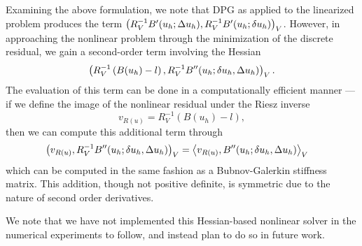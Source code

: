 Examining the above formulation, we note that DPG as applied to the linearized problem produces the term $ \LRp{R_V^{-1}B'(u_h;\Delta u_h), R_V^{-1}B'(u_h;\delta u_h)}_V$. However, in approaching the nonlinear problem through the minimization of the discrete residual, we gain a second-order term involving the Hessian
\[
\LRp{R_V^{-1}\left(B(u_h)-l\right),R_V^{-1}B''(u_h;\delta u_h,\Delta u_h)}_V.
\] 
The evaluation of this term can be done in a computationally efficient manner --- if we define the image of the nonlinear residual under the Riesz inverse
\[
v_{R(u)} = R_V^{-1}\left(B(u_h)-l\right),
\]
then we can compute this additional term through
\begin{align*}
\LRp{v_{R(u)},R_V^{-1}B''(u_h;\delta u_h,\Delta u_h)}_V &= \LRa{v_{R(u)},B''(u_h;\delta u_h,\Delta u_h)}_V
\end{align*}
which can be computed in the same fashion as a Bubnov-Galerkin stiffness matrix. This addition, though not positive definite, is symmetric due to the nature of second order derivatives. 

We note that we have not implemented this Hessian-based nonlinear solver in the numerical experiments to follow, and instead plan to do so in future work.  
